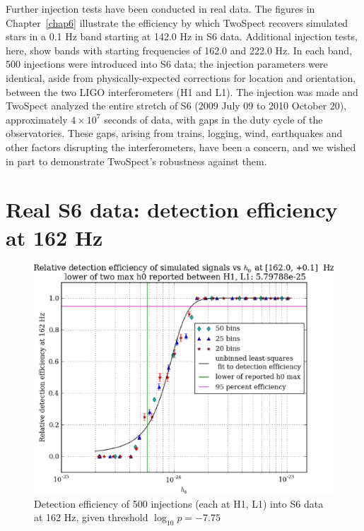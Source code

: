 
Further injection tests have been conducted in real data.
The figures in Chapter~\ref{chap6} illustrate the efficiency by which TwoSpect recovers simulated stars in a 0.1 Hz band starting at 142.0 Hz in S6 data.
Additional injection tests, here, show bands with starting frequencies of 162.0 and 222.0 Hz.
In each band, 500 injections were introduced into S6 data; the injection parameters were identical, aside from physically-expected corrections for location and orientation, between the two LIGO interferometers (H1 and L1).
The injection was made and TwoSpect analyzed the entire stretch of S6 (2009 July 09 to 2010 October 20), approximately $4 \times 10^7$ seconds of data, with gaps in the duty cycle of the observatories.
These gaps, arising from trains, logging, wind, earthquakes and other factors disrupting the interferometers, have been a concern, and we wished in part to demonstrate TwoSpect's robustness against them.


\section{Real S6 data: detection efficiency at 162 Hz}

\begin{figure}
\begin{center}
\includegraphics[width=0.70\paperwidth,height=0.48\paperheight]{plots/detectionEfficiencyh0-162-0Hz.eps}
\caption{
Detection efficiency of 500 injections (each at H1, L1) into
S6 data at 162 Hz, given threshold $\log_{10}p = -7.75$}
\label{S6_det_eff_162}
\end{center}
\end{figure}


